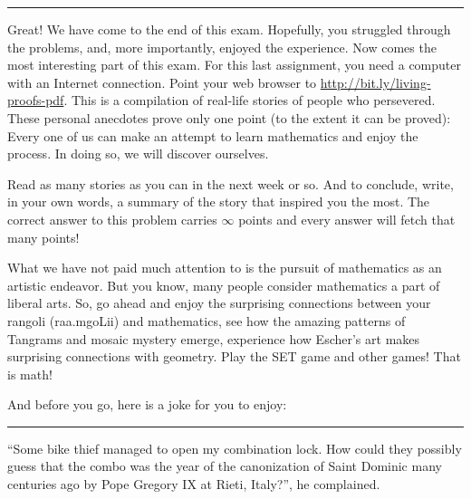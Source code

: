 \documentclass[12pt]{exam}         %
\begin{document}



\par\noindent\rule{\textwidth}{0.4pt}

\medskip

Great! We have come to the end of this exam. Hopefully, you struggled through the problems, and, more importantly, enjoyed the experience. Now comes the most interesting part of this exam. For this last assignment, you need a computer with an Internet connection. Point your web browser to \href{http://bit.ly/living-proofs-pdf}{http://bit.ly/living-proofs-pdf}. This is a compilation of real-life stories of people who persevered. These personal anecdotes prove only one point (to the extent it can be proved): Every one of us can make an attempt to learn mathematics and enjoy the process. In doing so, we will discover ourselves.

Read as many stories as you can in the next week or so. And to conclude, write, in your own words, a summary of the story that inspired you the most. The correct answer to this problem carries $\infty$ points and every answer will fetch that many points!

What we have not paid much attention to is the pursuit of mathematics as an artistic endeavor. But you know, many people consider mathematics a part of liberal arts. So, go ahead and enjoy the surprising connections between your rangoli (\textmarathi{raa.mgoLii}) and mathematics, see how the amazing patterns of Tangrams and mosaic mystery emerge, experience how Escher's art makes surprising connections with geometry. Play the SET game and other games! That is math!

And before you go, here is a joke for you to enjoy:

\par\noindent\rule{\textwidth}{0.4pt}
``Some bike thief managed to open my combination lock. How could they possibly guess that the combo was the year of the canonization of Saint Dominic many centuries ago by Pope Gregory IX at Rieti, Italy?'', he complained.
\end{document}
